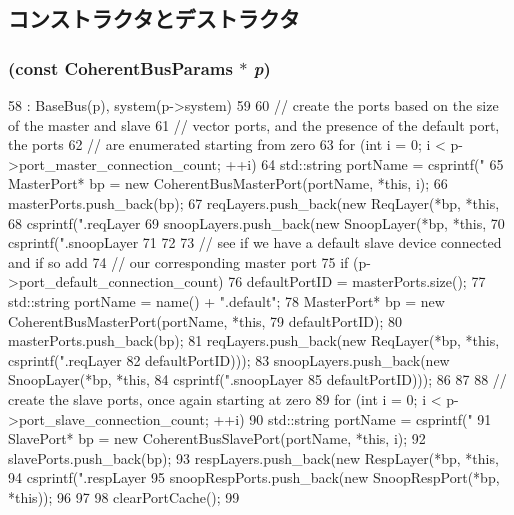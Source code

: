 \subsection{コンストラクタとデストラクタ}
\hypertarget{classCoherentBus_a0ca3474701c095c96854cb430f4f6bba}{
\subsubsection[{CoherentBus}]{ (const CoherentBusParams $\ast$ {\em p})}}
\label{classCoherentBus_a0ca3474701c095c96854cb430f4f6bba}



\begin{DoxyCode}
58     : BaseBus(p), system(p->system)
59 {
60     // create the ports based on the size of the master and slave
61     // vector ports, and the presence of the default port, the ports
62     // are enumerated starting from zero
63     for (int i = 0; i < p->port_master_connection_count; ++i) {
64         std::string portName = csprintf("%
65         MasterPort* bp = new CoherentBusMasterPort(portName, *this, i);
66         masterPorts.push_back(bp);
67         reqLayers.push_back(new ReqLayer(*bp, *this,
68                                          csprintf(".reqLayer%
69         snoopLayers.push_back(new SnoopLayer(*bp, *this,
70                                              csprintf(".snoopLayer%
71     }
72 
73     // see if we have a default slave device connected and if so add
74     // our corresponding master port
75     if (p->port_default_connection_count) {
76         defaultPortID = masterPorts.size();
77         std::string portName = name() + ".default";
78         MasterPort* bp = new CoherentBusMasterPort(portName, *this,
79                                                    defaultPortID);
80         masterPorts.push_back(bp);
81         reqLayers.push_back(new ReqLayer(*bp, *this, csprintf(".reqLayer%
82                                              defaultPortID)));
83         snoopLayers.push_back(new SnoopLayer(*bp, *this,
84                                              csprintf(".snoopLayer%
85                                                       defaultPortID)));
86     }
87 
88     // create the slave ports, once again starting at zero
89     for (int i = 0; i < p->port_slave_connection_count; ++i) {
90         std::string portName = csprintf("%
91         SlavePort* bp = new CoherentBusSlavePort(portName, *this, i);
92         slavePorts.push_back(bp);
93         respLayers.push_back(new RespLayer(*bp, *this,
94                                            csprintf(".respLayer%
95         snoopRespPorts.push_back(new SnoopRespPort(*bp, *this));
96     }
97 
98     clearPortCache();
99 }
\end{DoxyCode}
